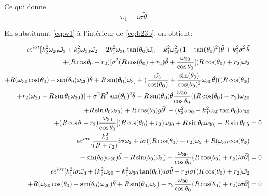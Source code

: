 Ce qui donne
\begin{equation}
    \tilde{\omega_1}=i \sigma \tilde{\theta}
    \label{eq:w1}
\end{equation}

En substituant \ref{eq:w1} à l'intérieur de \ref{eq:b23b}, on obtient:

\begin{align}
    \epsilon e^{i \sigma t} [k_2^2 \omega_{20} \tilde{\omega_3}+k_2^2 \omega_{30} \tilde{\omega_2} -2k_1^2\omega_{30} \tan(\theta_0)\tilde{\omega_3}-k_1^2 \omega_{30}^2(1+\tan(\theta_0)^2)\tilde{\theta} +k_1^2 \sigma^2 \tilde{\theta}& \nonumber \\
    +(R\cos{\theta_0}+r_2)[\sigma^2 ( R\cos(\theta_0)+r_2) \tilde{\theta}+\frac{\omega_{30}}{\cos{\theta_0}} [(R\cos(\theta_0)+r_2) \Tilde{\omega_2} & \nonumber \\
    +R(\omega_{30}\cos(\theta_0)-\sin(\theta_0)\omega_{20}) \Tilde{\theta}+R\sin(\theta_0) \Tilde{\omega_3} ] 
    + (\frac{\tilde{\omega_3}}{\cos(\theta_0)}+\frac{\sin(\theta_0)}{\cos(\theta_0)^2}\omega_{30}\tilde{\theta})((R\cos(\theta_0)& \nonumber \\
    +r_2)\omega_{20}+R \sin{\theta_0}\omega_{30})]+ \sigma^2 R^2 \sin(\theta_0)^2  \tilde{\theta}
    -R\sin(\theta_0)\tilde{\theta}\frac{\omega_{30}}{\cos{\theta_0}}  ((R\cos(\theta_0)+r_2)\omega_{20}& \nonumber \\
    +R \sin{\theta_0}\omega_{30})+R\cos(\theta_0)g\tilde{\theta}]+ (k_2^2\omega_{20}-k_1^2\omega_{30} \tan{\theta_0})\omega_{30}& \nonumber \\
    +(R\cos{\theta}+r_2)
     \frac{\omega_{30}}{\cos{\theta_0}}  [(R\cos(\theta_0)+r_2)\omega_{20}+R \sin{\theta_0}\omega_{30}]+ R\sin{\theta_0}g &=0 \nonumber\\ 
    \epsilon e^{i \sigma t}[\frac{k_2^2}{(R+r_2)} i \sigma \Tilde{\omega_2}+i \sigma((R\cos(\theta_0)+r_2) \Tilde{\omega_2} +R(\omega_{30}\cos(\theta_0)& \nonumber \\
    -\sin(\theta_0)\omega_{20}) \Tilde{\theta}+R\sin(\theta_0) \Tilde{\omega_3})+\frac{\omega_{30}}{\cos{\theta_0}} (R\cos(\theta_0)+r_2) i \sigma \tilde{\theta}]  &= 0 \nonumber\\
    \epsilon e^{i \sigma t} [k_1^2 i \sigma\Tilde{\omega_3}+ (k_2^2\omega_{20}-k_1^2\omega_{30} \tan(\theta_0)) i \sigma \tilde{\theta} -r_2 i \sigma ((R\cos(\theta_0)+r_2) \Tilde{\omega_2} & \nonumber \\
    +R(\omega_{30}\cos(\theta_0)-\sin(\theta_0)\omega_{20}) \Tilde{\theta}+R\sin(\theta_0) \Tilde{\omega_3} )- r_2\frac{\omega_{30}}{\cos{\theta_0}} (R\cos(\theta_0)+r_2) i \sigma \tilde{\theta}] &= 0
  \label{eq:b24}
\end{align}

